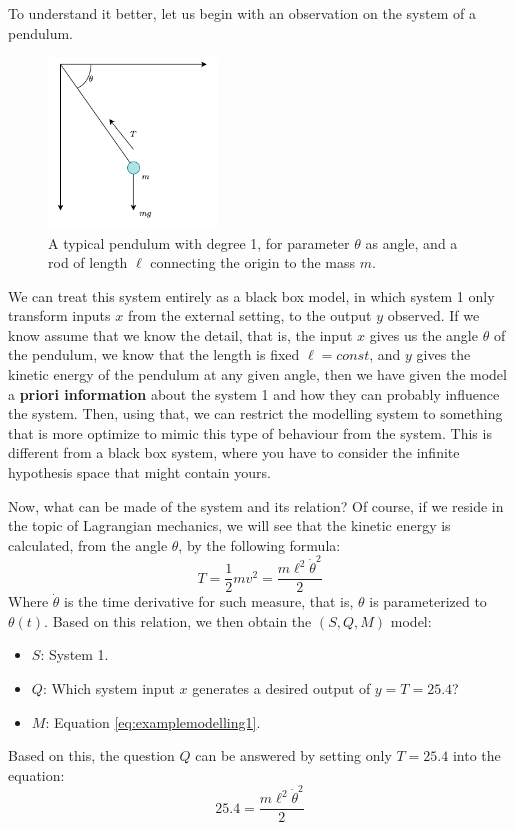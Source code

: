 To understand it better, let us begin with an observation on the system of a pendulum. 
\begin{figure}[h!]
    \centering
    \includegraphics[width=0.4\textwidth]{img/expreise.png}
    \caption{A typical pendulum with degree 1, for parameter $\theta$ as angle, and a rod of length $\ell$ connecting the origin to the mass $m$.}
    \label{fig:double_pendulum_modelling_example}
\end{figure}

We can treat this system entirely as a black box model, in which system 1 only transform inputs $x$ from the external setting, to the output $y$ observed. If we know assume that we know the detail, that is, the input $x$ gives us the angle $\theta$ of the pendulum, we know that the length is fixed $\ell = const$, and $y$ gives the kinetic energy of the pendulum at any given angle, then we have given the model a \textbf{priori information} about the system 1 and how they can probably influence the system. Then, using that, we can restrict the modelling system to something that is more optimize to mimic this type of behaviour from the system. This is different from a black box system, where you have to consider the infinite hypothesis space that might contain yours. 

Now, what can be made of the system and its relation? Of course, if we reside in the topic of Lagrangian mechanics, we will see that the kinetic energy is calculated, from the angle $\theta$, by the following formula:
\begin{equation}
    T = \frac{1}{2}mv^{2} = \frac{m\ell^{2}\dot{\theta}^{2}}{2} 
    \label{eq:examplemodelling1}
\end{equation}
Where $\dot{\theta}$ is the time derivative for such measure, that is, $\theta$ is parameterized to $\theta(t)$. Based on this relation, we then obtain the $(S,Q,M)$ model: 
\begin{itemize}[topsep=1pt, itemsep=1pt]
    \item $S$: System 1. 
    \item $Q$: Which system input $x$ generates a desired output of $y=T=25.4$? 
    \item $M$: Equation \ref{eq:examplemodelling1}. 
\end{itemize}
Based on this, the question $Q$ can be answered by setting only $T=25.4$ into the equation: 
\begin{equation}
    25.4 =\frac{m\ell^{2}\dot{\theta}^{2}}{2} 
\end{equation}

